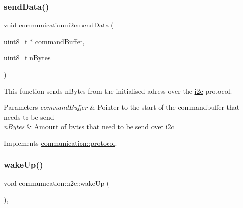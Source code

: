 \mbox{\label{classcommunication_1_1i2c_ad529784d80abf5e8bd493f578503e8e8}} 
\subsubsection{\texorpdfstring{send\+Data()}{sendData()}}
{\footnotesize\ttfamily void communication\+::i2c\+::send\+Data (\begin{DoxyParamCaption}\item[{uint8\+\_\+t $\ast$}]{command\+Buffer,  }\item[{uint8\+\_\+t}]{n\+Bytes }\end{DoxyParamCaption})\hspace{0.3cm}{\ttfamily [virtual]}}



This function sends n\+Bytes from the initialised adress over the \hyperlink{classcommunication_1_1i2c}{i2c} protocol. 


\begin{DoxyParams}{Parameters}
{\em command\+Buffer} & Pointer to the start of the commandbuffer that needs to be send \\
\hline
{\em n\+Bytes} & Amount of bytes that need to be send over \hyperlink{classcommunication_1_1i2c}{i2c} \\
\hline
\end{DoxyParams}


Implements \hyperlink{classcommunication_1_1protocol_a1745c4aac1b27bac2d350be54fedc388}{communication\+::protocol}.

\mbox{\label{classcommunication_1_1i2c_a342b43822a50e1837ac7c677083c7f39}} 
\subsubsection{\texorpdfstring{wake\+Up()}{wakeUp()}}
{\footnotesize\ttfamily void communication\+::i2c\+::wake\+Up (\begin{DoxyParamCaption}{ }\end{DoxyParamCaption})\hspace{0.3cm}{\ttfamily [override]}, {\ttfamily [virtual]}}



